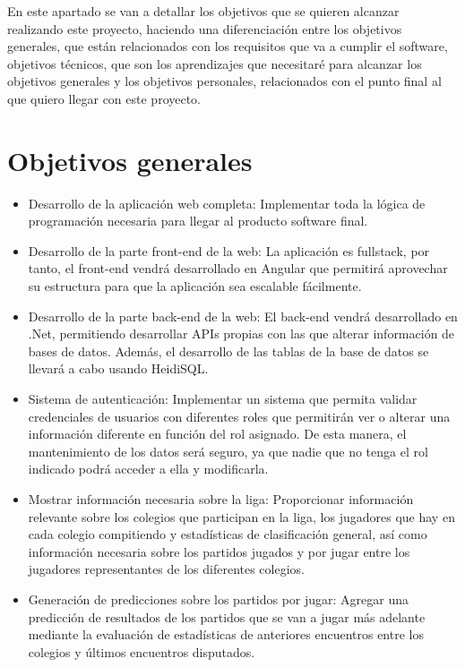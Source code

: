 
En este apartado se van a detallar los objetivos que se quieren alcanzar realizando este proyecto, haciendo una diferenciación entre los objetivos generales, que están relacionados con los requisitos que va a cumplir el software, objetivos técnicos, que son los aprendizajes que necesitaré para alcanzar los objetivos generales y los objetivos personales, relacionados con el punto final al que quiero llegar con este proyecto.

\section{Objetivos generales}\label{objetivos-generales}

\begin{itemize}
\tightlist
\item	
Desarrollo de la aplicación web completa: Implementar toda la lógica de programación necesaria para llegar al producto software final.

\item
Desarrollo de la parte front-end de la web: La aplicación es fullstack, por tanto, el front-end vendrá desarrollado en Angular que permitirá aprovechar su estructura para que la aplicación sea escalable fácilmente.

\item
Desarrollo de la parte back-end de la web: El back-end vendrá desarrollado en .Net, permitiendo desarrollar APIs propias con las que alterar información de bases de datos. Además, el desarrollo de las tablas de la base de datos se llevará a cabo usando HeidiSQL.

\item
Sistema de autenticación: Implementar un sistema que permita validar credenciales de usuarios con diferentes roles que permitirán ver o alterar una información diferente en función del rol asignado. De esta manera, el mantenimiento de los datos será seguro, ya que nadie que no tenga el rol indicado podrá acceder a ella y modificarla.

\item
Mostrar información necesaria sobre la liga: Proporcionar información relevante sobre los colegios que participan en la liga, los jugadores que hay en cada colegio compitiendo y estadísticas de clasificación general, así como información necesaria sobre los partidos jugados y por jugar entre los jugadores representantes de los diferentes colegios.

\item
Generación de predicciones sobre los partidos por jugar: Agregar una predicción de resultados de los partidos que se van a jugar más adelante mediante la evaluación de estadísticas de anteriores encuentros entre los colegios y últimos encuentros disputados.
\end{itemize}




